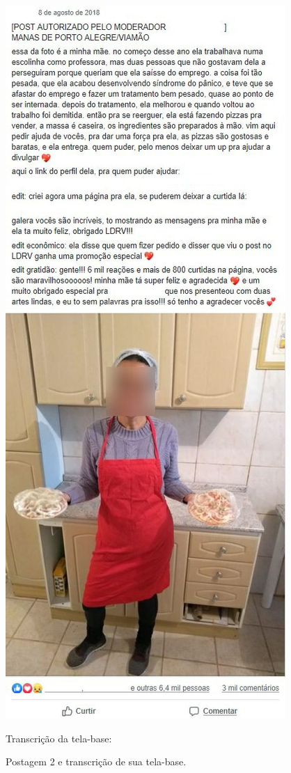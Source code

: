 \documentclass{textolivre-html}
\begin{document}
\begin{figure}[htbp]
\begin{minipage}{.45\textwidth}
 \includegraphics[width=\textwidth]{fig04.png}
 \caption{Postagem 2 e transcrição de sua tela-base.}
 \label{fig04}
 \end{minipage}\hfill
 \begin{minipage}{0.5\textwidth}
 Transcrição da tela-base:\\
 

\end{minipage}
\end{figure}
\end{document}
